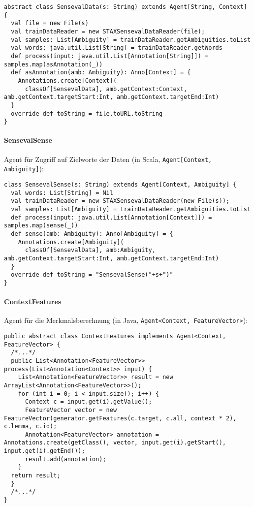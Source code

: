 \documentclass[abstracton, 12pt]{scrartcl}
\begin{document}
\begin{lstlisting}
abstract class SensevalData(s: String) extends Agent[String, Context] {
  val file = new File(s)
  val trainDataReader = new STAXSensevalDataReader(file);
  val samples: List[Ambiguity] = trainDataReader.getAmbiguities.toList
  val words: java.util.List[String] = trainDataReader.getWords
  def process(input: java.util.List[Annotation[String]]) = samples.map(asAnnotation(_))
  def asAnnotation(amb: Ambiguity): Anno[Context] = {
    Annotations.create[Context](
      classOf[SensevalData], amb.getContext:Context, amb.getContext.targetStart:Int, amb.getContext.targetEnd:Int)
  }
  override def toString = file.toURL.toString
}
\end{lstlisting}

\paragraph{SensevalSense}

Agent für Zugriff auf Zielworte der Daten  (in Scala, \lstinline!Agent[Context, Ambiguity]!):

\begin{lstlisting}
class SensevalSense(s: String) extends Agent[Context, Ambiguity] {
  val words: List[String] = Nil
  val trainDataReader = new STAXSensevalDataReader(new File(s));
  val samples: List[Ambiguity] = trainDataReader.getAmbiguities.toList
  def process(input: java.util.List[Annotation[Context]]) = samples.map(sense(_))
  def sense(amb: Ambiguity): Anno[Ambiguity] = {
    Annotations.create[Ambiguity](
      classOf[SensevalData], amb:Ambiguity, amb.getContext.targetStart:Int, amb.getContext.targetEnd:Int)
  }
  override def toString = "SensevalSense("+s+")"
}
\end{lstlisting}

\paragraph{ContextFeatures}

Agent für die Merkmalsberechnung (in Java, \lstinline!Agent<Context, FeatureVector>!):

\begin{lstlisting}
public abstract class ContextFeatures implements Agent<Context, FeatureVector> {
  /*...*/
  public List<Annotation<FeatureVector>> process(List<Annotation<Context>> input) {
    List<Annotation<FeatureVector>> result = new ArrayList<Annotation<FeatureVector>>();
    for (int i = 0; i < input.size(); i++) {
      Context c = input.get(i).getValue();
      FeatureVector vector = new FeatureVector(generator.getFeatures(c.target, c.all, context * 2), c.lemma, c.id);
      Annotation<FeatureVector> annotation = Annotations.create(getClass(), vector, input.get(i).getStart(), input.get(i).getEnd());
      result.add(annotation);
    }
  return result;
  }
  /*...*/
}
\end{lstlisting}
\end{document}

